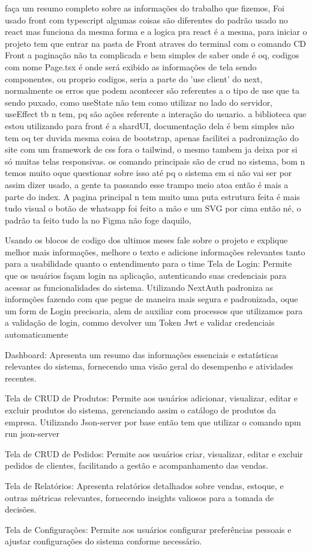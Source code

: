 faça um resumo completo sobre as informações do trabalho que fizemos, 
Foi usado front com typescript algumas coisas são diferentes do padrão usado no react mas funciona da mesma forma e a logica pra react é a mesma, para iniciar o projeto tem que entrar na pasta de Front atraves do terminal com o comando CD Front a paginação não ta complicada e bem simples de saber onde é oq, codigos com nome Page.tsx é onde será exibido as informações de tela sendo componentes, ou proprio codigos, seria a parte do 'use client' do next, normalmente os erros que podem acontecer são referentes a o tipo de use que ta sendo puxado, como useState não tem como utilizar no lado do servidor, useEffect tb n tem, pq são ações referente a interação do usuario. a biblioteca que estou utilizando para front é a shardUI, documentação dela é bem simples não tem oq ter duvida mesma coisa de bootstrap, apenas facilitei a padronização do site com um framework de css fora o tailwind, o mesmo tambem ja deixa por si só muitas telas responsivas. os comando principais são de crud no sistema, bom n temos muito oque questionar sobre isso até pq o sistema em si não vai ser por assim dizer usado, a gente ta passando esse trampo meio atoa então é mais a parte do index. 
A pagina principal n tem muito uma puta estrutura feita é mais tudo visual o botão de whatsapp foi feito a mão e um SVG por cima então né, o padrão ta feito tudo la no Figma não foge daquilo, 

Usando os blocos de codigo dos ultimos meses fale sobre o projeto e explique melhor mais informações, melhore o texto e adicione informações relevantes tanto para a usabilidade quanto o entendimento para o time
Tela de Login: Permite que os usuários façam login na aplicação, autenticando suas credenciais para acessar as funcionalidades do sistema.
Utilizando NextAuth padroniza as informções fazendo com que pegue de maneira mais segura e padronizada, oque um form de Login precisaria, alem de auxiliar com processos que utilizamos para a validação de login, commo devolver um Token Jwt e validar credenciais automaticamente

Dashboard: Apresenta um resumo das informações essenciais e estatísticas relevantes do sistema, fornecendo uma visão geral do desempenho e atividades recentes.

Tela de CRUD de Produtos: Permite aos usuários adicionar, visualizar, editar e excluir produtos do sistema, gerenciando assim o catálogo de produtos da empresa.
Utilizando Json-server por base então tem que utilizar o comando npm run json-server

Tela de CRUD de Pedidos: Permite aos usuários criar, visualizar, editar e excluir pedidos de clientes, facilitando a gestão e acompanhamento das vendas.

Tela de Relatórios: Apresenta relatórios detalhados sobre vendas, estoque, e outras métricas relevantes, fornecendo insights valiosos para a tomada de decisões.

Tela de Configurações: Permite aos usuários configurar preferências pessoais e ajustar configurações do sistema conforme necessário.